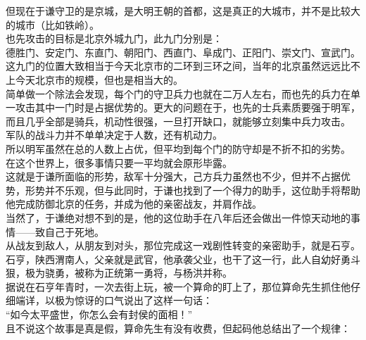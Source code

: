\begin{multicols}{\theparacolNo}
但现在于谦守卫的是京城，是大明王朝的首都，这是真正的大城市，并不是比较大的城市（比如铁岭）。\\

也先攻击的目标是北京外城九门，此九门分别是：\\

德胜门、安定门、东直门、朝阳门、西直门、阜成门、正阳门、崇文门、宣武门。\\

这九门的位置大致相当于今天北京市的二环到三环之间，当年的北京虽然远远比不上今天北京市的规模，但也是相当大的。\\

简单做一个除法会发现，每个门的守卫兵力也就在二万人左右，而也先的兵力在单一攻击其中一门时是占据优势的。更大的问题在于，也先的士兵素质要强于明军，而且几乎全部是骑兵，机动性很强，一旦打开缺口，就能够立刻集中兵力攻击。\\

军队的战斗力并不单单决定于人数，还有机动力。\\

所以明军虽然在总的人数上占优，但平均到每个门的防守却是不折不扣的劣势。\\

在这个世界上，很多事情只要一平均就会原形毕露。\\

这就是于谦所面临的形势，敌军十分强大，己方兵力虽然也不少，但并不占据优势，形势并不乐观，但与此同时，于谦也找到了一个得力的助手，这位助手将帮助他完成防御北京的任务，并成为他的亲密战友，并肩作战。\\

当然了，于谦绝对想不到的是，他的这位助手在八年后还会做出一件惊天动地的事情——致自己于死地。\\

从战友到敌人，从朋友到对头，那位完成这一戏剧性转变的亲密助手，就是石亨。\\

石亨，陕西渭南人，父亲就是武官，他承袭父业，也干了这一行，此人自幼好勇斗狠，极为骁勇，被称为正统第一勇将，与杨洪并称。\\

据说在石亨年青时，一次去街上玩，被一个算命的盯上了，那位算命先生抓住他仔细端详，以极为惊讶的口气说出了这样一句话：\\

“如今太平盛世，你怎么会有封侯的面相！”\\

且不说这个故事是真是假，算命先生有没有收费，但起码他总结出了一个规律：\\


\end{multicols}

